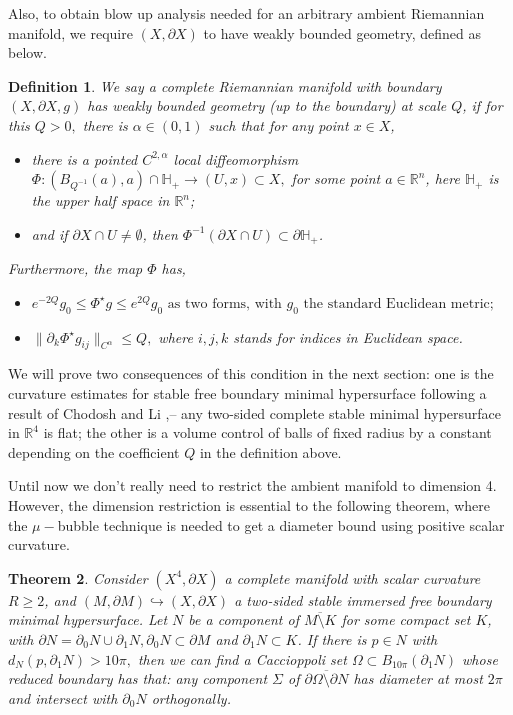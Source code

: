\documentclass[12pt]{amsart}
\newcommand{\HH}{\mathbb{H}}
\newcommand{\R}{\mathbb R}
\newcommand{\p}{\partial}
\newtheorem{theorem}{Theorem}[section]
\newtheorem{definition}[theorem]{Definition}
\numberwithin{equation}{section}
\begin{document}
	Also, to obtain blow up analysis needed for an arbitrary ambient Riemannian manifold, we require $(X,\partial X)$ to have weakly bounded geometry, defined as below.

	\begin{definition}\label{defWBG}
		We say a complete Riemannian manifold with boundary $(X,\partial X,g)$ has weakly bounded geometry (up to the boundary) at scale $Q$, if for this $Q>0,$ there is $\alpha \in (0,1)$ such that for any point $x \in X$, 
        \begin{itemize}
            \item there is a pointed $C^{2,\alpha}$ local diffeomorphism $\Phi: (B_{Q^{-1}}(a),a)\cap \HH_+ \rightarrow(U,x) \subset X,$ for some point $a \in \R^n$, here $\HH_+$ is the upper half space in $\R^n$;
            \item and if $\partial X \cap U \neq \emptyset$, then $\Phi^{-1}(\partial X \cap U) \subset \partial \HH_+$.
        \end{itemize}
		Furthermore, the map $\Phi$ has,
        \begin{itemize}
            \item $e^{-2Q} g_0\leq \Phi^{\star} g \leq e^{2Q} g_0 \text{ as two forms, with } g_0 \text{ the standard Euclidean metric;}$
            \item $\|\p_k \Phi^{\star} g_{ij}\|_{C^{\alpha}} \leq Q,$ where $i,j,k$ stands for indices in Euclidean space.
        \end{itemize}
	\end{definition}
    We will prove two consequences of this condition in the next section: one is the curvature estimates for stable free boundary minimal hypersurface following a result of Chodosh and Li \cite{ChodoLi2021-StableMinimalHypersurfaces},\cite{ChodoLi2022-StableAnisotropicMinimal}-- any two-sided complete stable minimal hypersurface in $\R^4$ is flat; the other is a volume control of balls of fixed radius by a constant depending on the coefficient $Q$ in the definition above.

	Until now we don't really need to restrict the ambient manifold to dimension 4. However, the dimension restriction is essential to the following theorem, where the $\mu-$bubble technique is needed to get a diameter bound using positive scalar curvature.

	\begin{theorem}
		Consider $(X^4,\p X)$ a complete manifold with scalar curvature $R\geq 2$, and $(M,\p M) \hookrightarrow (X,\p X)$ a two-sided stable immersed free boundary minimal hypersurface.
		Let $N$ be a component of $\overline{M \setminus K}$ for some compact set $K$, with $\p N =\p_0 N \cup \p_1 N, \p_0 N \subset \p M$ and $\p_1 N \subset K$. If there is $p\in N$ with $d_N(p,\p_1 N)>10\pi,$ then we can find a Caccioppoli set $\Omega \subset B_{10\pi}(\p_1N)$ whose reduced boundary has that: any component $\Sigma$ of $\overline{\p \Omega \setminus \p N}$ has diameter at most $2\pi$ and intersect with $\p_0 N$ orthogonally.
	\end{theorem}
\end{document}
